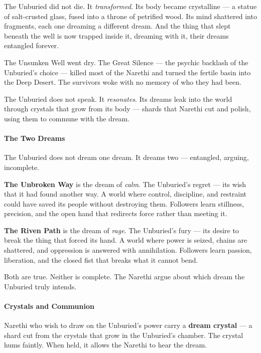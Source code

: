 The Unburied did not die. It \textit{transformed}. Its body became crystalline --- a statue of salt-crusted glass, fused into a throne of petrified wood. Its mind shattered into fragments, each one dreaming a different dream. And the thing that slept beneath the well is now trapped inside it, dreaming with it, their dreams entangled forever.

The Unsunken Well went dry. The Great Silence --- the psychic backlash of the Unburied's choice --- killed most of the Narethi and turned the fertile basin into the Deep Desert. The survivors woke with no memory of who they had been.

The Unburied does not speak. It \textit{resonates}. Its dreams leak into the world through crystals that grow from its body --- shards that Narethi cut and polish, using them to commune with the dream.

\paragraph{The Two Dreams}
The Unburied does not dream one dream. It dreams two --- entangled, arguing, incomplete.

\textbf{The Unbroken Way} is the dream of \textit{calm}. The Unburied's regret --- its wish that it had found another way. A world where control, discipline, and restraint could have saved its people without destroying them. Followers learn stillness, precision, and the open hand that redirects force rather than meeting it.

\textbf{The Riven Path} is the dream of \textit{rage}. The Unburied's fury --- its desire to break the thing that forced its hand. A world where power is seized, chains are shattered, and oppression is answered with annihilation. Followers learn passion, liberation, and the closed fist that breaks what it cannot bend.

Both are true. Neither is complete. The Narethi argue about which dream the Unburied truly intends.

\paragraph{Crystals and Communion}
Narethi who wish to draw on the Unburied's power carry a \textbf{dream crystal} --- a shard cut from the crystals that grow in the Unburied's chamber. The crystal hums faintly. When held, it allows the Narethi to hear the dream.


